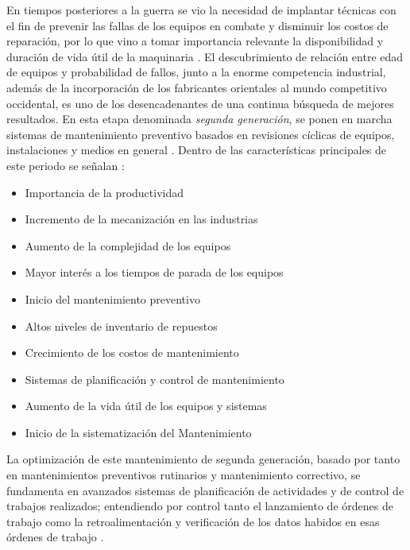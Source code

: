 En tiempos posteriores a la guerra se vio la necesidad de implantar técnicas con el fin de prevenir las fallas de los equipos en combate y disminuir los costos de reparación, por lo que vino a tomar importancia relevante la disponibilidad y duración de vida útil de la maquinaria \parencite{garcia2012}. El descubrimiento de relación entre edad de equipos y probabilidad de fallos, junto a la enorme competencia industrial, además de la incorporación de los fabricantes orientales al mundo competitivo occidental, es uno de los desencadenantes de una continua búsqueda de mejores resultados. En esta etapa denominada \textit{segunda generación}, se ponen en marcha sistemas de mantenimiento preventivo basados en revisiones cíclicas de equipos, instalaciones y medios en general \parencite{gonzalez2005}. Dentro de las características principales de este periodo se señalan \parencite{garcia2012}:

\begin{itemize}
\item Importancia de la productividad
\item Incremento de la mecanización en las industrias
\item Aumento de la complejidad de los equipos
\item Mayor interés a los tiempos de parada de los equipos
\item Inicio del mantenimiento preventivo
\item Altos niveles de inventario de repuestos
\item Crecimiento de los costos de mantenimiento
\item Sistemas de planificación y control de mantenimiento
\item Aumento de la vida útil de los equipos y sistemas
\item Inicio de la sistematización del Mantenimiento
\end{itemize}

La optimización de este mantenimiento de segunda generación, basado por tanto en mantenimientos preventivos rutinarios y mantenimiento correctivo, se fundamenta en avanzados sistemas de planificación de actividades y de control de trabajos realizados; entendiendo por control tanto el lanzamiento de órdenes de trabajo como la retroalimentación y verificación de los datos habidos en esas órdenes de trabajo \parencite{gonzalez2005}.

